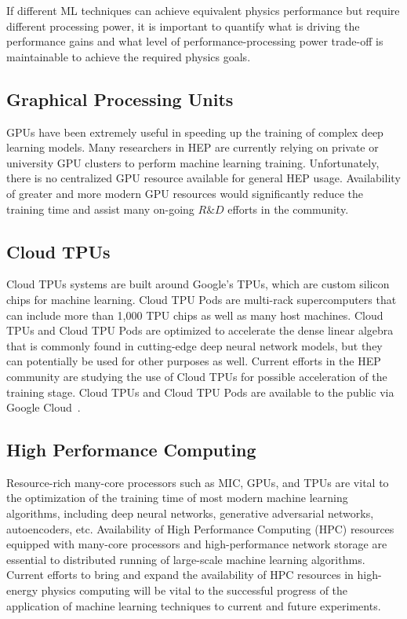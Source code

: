 If different ML techniques can achieve equivalent physics performance but require different processing power, it is important to quantify what is driving the performance gains and what level of performance-processing power trade-off is maintainable to achieve the required physics goals.

\subsection{Graphical Processing Units}\label{subsec:GPU}

GPUs have been extremely useful in speeding up the training of complex deep learning models. Many researchers in HEP are currently relying on private or university GPU clusters to perform machine learning training. Unfortunately, there is no centralized GPU resource available for general HEP usage. Availability of greater and more modern GPU resources would significantly reduce the training time and assist many on-going $R\&D$ efforts in the community.

\subsection{Cloud TPUs}\label{subsec:TPU}

Cloud TPUs systems are built around Google's TPUs, which are custom silicon chips for machine learning.
Cloud TPU Pods are multi-rack supercomputers that can include more than 1,000 TPU chips as well as many host machines.
Cloud TPUs and Cloud TPU Pods are optimized to accelerate the dense linear algebra that is commonly found in cutting-edge deep neural network models, but they can potentially be used for other purposes as well.
Current efforts in the HEP community are studying the use of Cloud TPUs for possible acceleration of the training stage.
Cloud TPUs and Cloud TPU Pods are available to the public via Google Cloud~\cite{cloudgoogle}.

\subsection{High Performance Computing}

Resource-rich many-core processors such as MIC, GPUs, and TPUs are vital to the optimization of the training time of most modern machine learning algorithms, including deep neural networks, generative adversarial networks, autoencoders, etc. Availability of High Performance Computing (HPC) resources equipped with many-core processors and high-performance network storage are essential to distributed running of large-scale machine learning algorithms. Current efforts to bring and expand the availability of HPC resources in high-energy physics computing will be vital to the successful progress of the application of machine learning techniques to current and future experiments.

